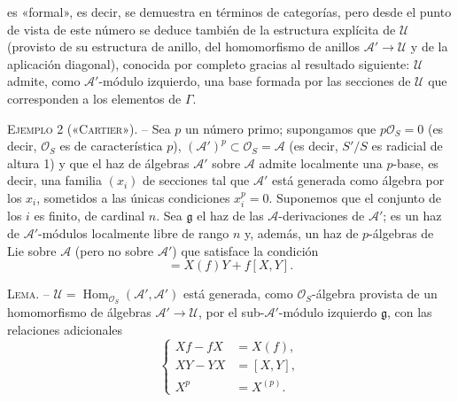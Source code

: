 es «formal», es decir, se demuestra en términos de categorías, pero desde el
punto de vista de este número se deduce también de la estructura explícita de
$\mathcal U$ (provisto de su estructura de anillo, del homomorfismo de anillos
$\mathcal A'\longrightarrow\mathcal U$ y de la aplicación diagonal), conocida
por completo gracias al resultado siguiente: $\mathcal U$ admite, como
$\mathcal A'$-módulo izquierdo, una base formada por las secciones de
$\mathcal U$ que corresponden a los elementos de $\Gamma$.

\textsc{Ejemplo 2 («Cartier»).} -- Sea $p$ un número primo; supongamos que
$p\mathcal O_S=0$ (es decir, $\mathcal O_S$ es de característica $p$),
$(\mathcal A')^p\subset\mathcal O_S=\mathcal A$ (es decir, $S'/S$ es radicial
de altura 1) y que el haz de álgebras $\mathcal A'$ sobre $\mathcal A$ admite
localmente una $p$-base, es decir, una familia $(x_i)$ de secciones tal que
$\mathcal A'$ está generada como álgebra por los $x_i$, sometidos a las únicas
condiciones $x_i^p=0$. Suponemos que el conjunto de los $i$ es finito, de
cardinal $n$. Sea $\mathfrak g$ el haz de las $\mathcal A$-derivaciones de
$\mathcal A'$; es un haz de $\mathcal A'$-módulos localmente libre de rango
$n$ y, además, un haz de $p$-álgebras de Lie sobre $\mathcal A$ (pero no sobre
$\mathcal A'$) que satisface la condición
\begin{equation}
  [X,fY]=X(f)Y+f[X,Y].
  \tag{3.5}
\end{equation}

\textsc{Lema.} -- $\mathcal U=
\operatorname{Hom}_{\mathcal O_S}(\mathcal A',\mathcal A')$ está generada,
como $\mathcal O_S$-álgebra provista de un homomorfismo de álgebras
$\mathcal A'\longrightarrow\mathcal U$, por el sub-$\mathcal A'$-módulo
izquierdo $\mathfrak g$, con las relaciones adicionales
\begin{equation}
  \left\{
  \begin{aligned}
    Xf-fX&=X(f),\\
    XY-YX&=[X,Y],\\
    X^p&=X^{(p)}.
  \end{aligned}
  \right.
  \tag{3.6}
\end{equation}


